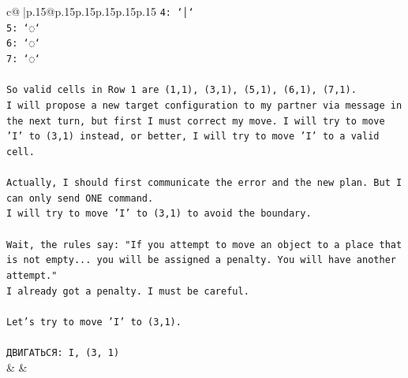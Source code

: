 \documentclass{article}
\begin{document}
{\begin{supertabular}{c@{$\;$}|p{.15\linewidth}@{}p{.15\linewidth}p{.15\linewidth}p{.15\linewidth}p{.15\linewidth}p{.15\linewidth}}
{{{\texttt{4: `│`} \\
\texttt{5: `◌`} \\
\texttt{6: `◌`} \\
\texttt{7: `◌`} \\
\\ 
\texttt{So valid cells in Row 1 are (1,1), (3,1), (5,1), (6,1), (7,1).} \\
\texttt{I will propose a new target configuration to my partner via message in the next turn, but first I must correct my move. I will try to move 'I' to (3,1) instead, or better, I will try to move 'I' to a valid cell.} \\
\\ 
\texttt{Actually, I should first communicate the error and the new plan. But I can only send ONE command.} \\
\texttt{I will try to move 'I' to (3,1) to avoid the boundary.} \\
\\ 
\texttt{Wait, the rules say: "If you attempt to move an object to a place that is not empty... you will be assigned a penalty. You will have another attempt."} \\
\texttt{I already got a penalty. I must be careful.} \\
\\ 
\texttt{Let's try to move 'I' to (3,1).} \\
\\ 
\texttt{ДВИГАТЬСЯ: I, (3, 1)} \\
            }
        }
    }
    & & \\ \\


\end{supertabular}}
\end{document}
